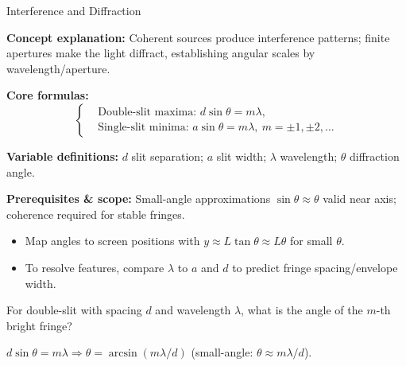 \begin{KnowledgePoint}{Interference and Diffraction \Core}
  \KPFormulas
  \begin{formulabox}
  \textbf{Concept explanation:} Coherent sources produce interference patterns; finite apertures make the light diffract, establishing angular scales by wavelength/aperture.

  \textbf{Core formulas:}
  \[
  \left\{\begin{aligned}
    &\text{Double-slit maxima: } d\sin\theta=m\lambda,\\
    &\text{Single-slit minima: } a\sin\theta=m\lambda,\ m=\pm1,\pm2,\dots
  \end{aligned}\right.
  \]

  \textbf{Variable definitions:} $d$ slit separation; $a$ slit width; $\lambda$ wavelength; $\theta$ diffraction angle.

  \textbf{Prerequisites \& scope:} Small-angle approximations $\sin\theta\approx\theta$ valid near axis; coherence required for stable fringes.
  \end{formulabox}

  \KPHeuristics
  \begin{heuristicsbox}
  \begin{itemize}[leftmargin=*]
    \item Map angles to screen positions with $y\approx L\tan\theta\approx L\theta$ for small $\theta$.
    \item To resolve features, compare $\lambda$ to $a$ and $d$ to predict fringe spacing/envelope width.
  \end{itemize}
  \end{heuristicsbox}

  \KPProblems
  \begin{cheatproblem}
  For double-slit with spacing $d$ and wavelength $\lambda$, what is the angle of the $m$-th bright fringe?
  \begin{solutionbox}
  $d\sin\theta=m\lambda \Rightarrow \theta=\arcsin(m\lambda/d)$ (small-angle: $\theta\approx m\lambda/d$).
  \end{solutionbox}
  \end{cheatproblem}
\end{KnowledgePoint}


